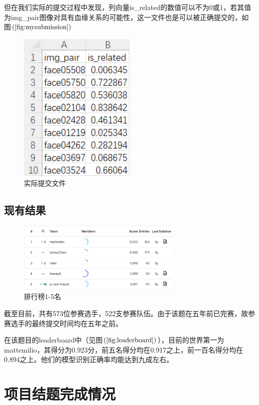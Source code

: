 \documentclass[UTF8]{ctexart}
\begin{document}
但在我们实际的提交过程中发现，列向量is\_related的数值可以不为0或1，若其值为img\_pair图像对具有血缘关系的可能性，这一文件也是可以被正确提交的，如图$\left(\ref{fig:mysubmission}\right)$
\begin{figure}[!ht]
  \centering
  \includegraphics[width=0.5\textwidth]{mysubmission.png}
  \caption{实际提交文件}
  \label{fig:mysubmission}
\end{figure}

\subsection{现有结果}
\begin{figure}[!ht]
  \centering
  \includegraphics[width=0.7\textwidth]{leaderboard.jpg}
  \caption{排行榜1-5名}
  \label{fig:leaderboard}
\end{figure}
截至目前，共有573位参赛选手，522支参赛队伍。由于该题在五年前已完赛，故参赛选手的最终提交时间均在五年之前。

在该题目的leaderboard中（见图$\left(\ref{fig:leaderboard}\right)$），目前的世界第一为mattemilio，其得分为0.923分，前五名得分均在0.917之上，前一百名得分均在0.894之上。他们的模型识别正确率均能达到九成左右。

\section{项目结题完成情况}
\end{document}
